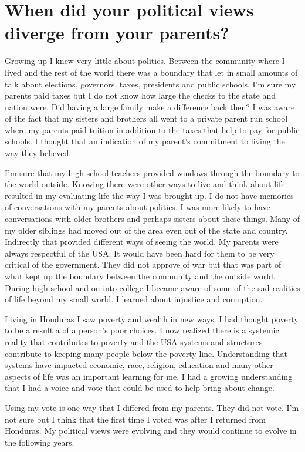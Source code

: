 \section{When did your political views diverge from your parents?} %
Growing up I knew very little about politics.
Between the community where I lived and the rest of the world there was a boundary that let in small amounts of talk about elections, governors, taxes, presidents and public schools.
I'm sure my parents paid taxes but I do not know how large the checks to the state and nation were.
Did having a large family make a difference back then? I was aware of the fact that my sisters and brothers all went to a private parent run school where my parents paid tuition in addition to the taxes that help to pay for public schools.
I thought that an indication of my parent's commitment to living the way they believed.

I'm sure that my high school teachers provided windows through the boundary to the world outside.
Knowing there were other ways to live and think about life resulted in my evaluating life the way I was brought up.
I do not have memories of conversations with my parents about politics.
I was more likely to have conversations with older brothers and perhaps sisters about these things.
Many of my older siblings had moved out of the area even out of the state and country.
Indirectly that provided different ways of seeing the world.
My parents were always respectful of the USA.
It would have been hard for them to be very critical of the government.
They did not approve of war but that was part of what kept up the boundary between the community and the outside world.
During high school and on into college I became aware of some of the sad realities of life beyond my small world.
I learned about injustice and corruption.

Living in Honduras I saw poverty and wealth in new ways.
I had thought poverty to be a result a of a person's poor choices.
I now realized there is a systemic reality that contributes to poverty and the USA systems and structures contribute to keeping many people below the poverty line.
Understanding that systems have impacted economic, race, religion, education and many other aspects of life was an important learning for me.
I had a growing understanding that I had a voice and vote that could be used to help bring about change.

Using my vote is one way that I differed from my parents.
They did not vote.
I'm not sure but I think that the first time I voted was after I returned from Honduras.
My political views were evolving and they would continue to evolve in the following years.

